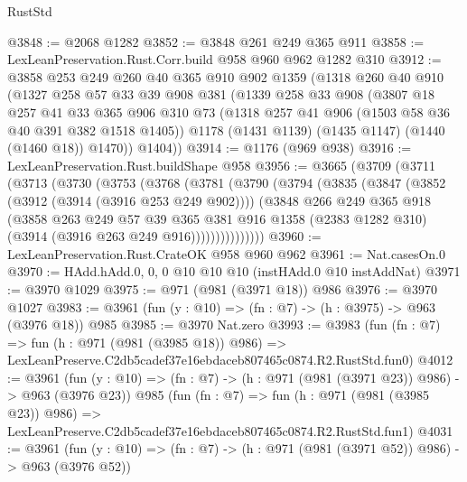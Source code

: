 \begin{lexlean}{RustStd}
\begin{coremodule}
@3848 := @2068 @1282
@3852 := @3848 @261 @249 @365 @911
@3858 := LexLeanPreservation.Rust.Corr.build @958 @960 @962 @1282 @310
@3912 := @3858
    @253
    @249
    @260
    @40
    @365
    @910
    @902
    @1359
    (@1318
      @260
      @40
      @910
      (@1327
        @258
        @57
        @33
        @39
        @908
        @381
        (@1339
          @258
          @33
          @908
          (@3807
            @18
            @257
            @41
            @33
            @365
            @906
            @310
            @73
            (@1318 @257 @41 @906 (@1503 @58 @36 @40 @391 @382 @1518 @1405))
            @1178
            (@1431 @1139)
            (@1435 @1147)
            (@1440 (@1460 @18))
            @1470))
        @1404))
@3914 := @1176 (@969 @938)
@3916 := LexLeanPreservation.Rust.buildShape @958
@3956 := @3665
    (@3709
      (@3711
        (@3713
          (@3730
            (@3753
              (@3768
                (@3781
                  (@3790
                    (@3794
                      (@3835
                        (@3847
                          (@3852 (@3912 (@3914 (@3916 @253 @249 @902))))
                          (@3848
                            @266
                            @249
                            @365
                            @918
                            (@3858
                              @263
                              @249
                              @57
                              @39
                              @365
                              @381
                              @916
                              @1358
                              (@2383 @1282 @310)
                              (@3914 (@3916 @263 @249 @916)))))))))))))))
@3960 := LexLeanPreservation.Rust.CrateOK @958 @960 @962
@3961 := Nat.casesOn.{0}
@3970 := HAdd.hAdd.{0, 0, 0} @10 @10 @10 (instHAdd.{0} @10 instAddNat)
@3971 := @3970 @1029
@3975 := @971 (@981 (@3971 @18)) @986
@3976 := @3970 @1027
@3983 := @3961 (fun (y : @10) => (fn : @7) -> (h : @3975) -> @963 (@3976 @18)) @985
@3985 := @3970 Nat.zero
@3993 := @3983
    (fun (fn : @7) =>
    fun (h : @971 (@981 (@3985 @18)) @986) =>
    LexLeanPreserve.C2db5cadef37e16ebdaceb807465c0874.R2.RustStd.fun0)
@4012 := @3961
    (fun (y : @10) => (fn : @7) -> (h : @971 (@981 (@3971 @23)) @986) -> @963 (@3976 @23))
    @985
    (fun (fn : @7) =>
    fun (h : @971 (@981 (@3985 @23)) @986) =>
    LexLeanPreserve.C2db5cadef37e16ebdaceb807465c0874.R2.RustStd.fun1)
@4031 := @3961
    (fun (y : @10) => (fn : @7) -> (h : @971 (@981 (@3971 @52)) @986) -> @963 (@3976 @52))

\end{coremodule}
\end{lexlean}
